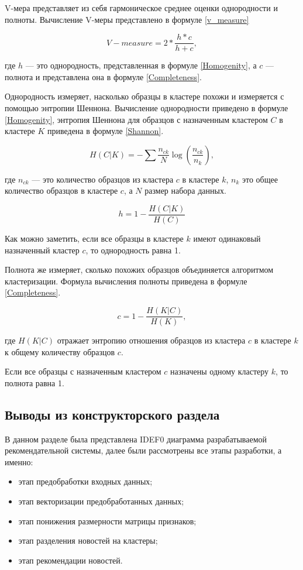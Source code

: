 V-мера представляет из себя гармоническое среднее оценки однородности и полноты. Вычисление V-меры представлено в формуле \ref{v_measure}

\begin{equation}
\label{V_measure}
V-measure = 2 * \frac{h * c}{h + c},
\end{equation}

где $h$ --- это однородность, представленная в формуле \ref{Homogenity}, а $c$ --- полнота и представлена она в формуле \ref{Completeness}.

Однородность измеряет, насколько образцы в кластере похожи и измеряется с помощью энтропии Шеннона. Вычисление однородности приведено в формуле \ref{Homogenity}, энтропия Шеннона для образцов с назначенным кластером $C$ в кластере $K$ приведена в формуле \ref{Shannon}.

\begin{equation}
\label{Shannon}
H(C|K) = -\sum\frac{n_{ck}}{N}\log(\frac{n_{ck}}{n_k}),
\end{equation}

где $n_{ck}$ --- это количество образцов из кластера $c$ в кластере $k$, $n_k$ это общее количество образцов в кластере $c$, а $N$ размер набора данных.

\begin{equation}
\label{Homogenity}
h = 1 - \frac{H(C|K)}{H(C)}
\end{equation}

Как можно заметить, если все образцы в кластере $k$ имеют одинаковый назначенный кластер $c$, то однородность равна 1.

Полнота же измеряет, сколько похожих образцов объединяется алгоритмом кластеризации. Формула вычисления полноты приведена в формуле \ref{Completeness}.

\begin{equation}
\label{Completeness}
c = 1 - \frac{H(K|C)}{H(K)},
\end{equation}

где $H(K|C)$ отражает энтропию отношения образцов из кластера $c$ в кластере $k$ к общему количеству образцов $c$.

Если все образцы с назначенным кластером $c$ назначены одному кластеру $k$, то полнота равна 1.


\subsection{Выводы из конструкторского раздела}

В данном разделе была представлена IDEF0 диаграмма разрабатываемой рекомендательной системы, далее были рассмотрены все этапы разработки, а именно:
\begin{itemize}
	\item этап предобработки входных данных;
	\item этап векторизации предобработанных данных;
	\item этап понижения размерности матрицы признаков;
	\item этап разделения новостей на кластеры;
	\item этап рекомендации новостей.
\end{itemize}

